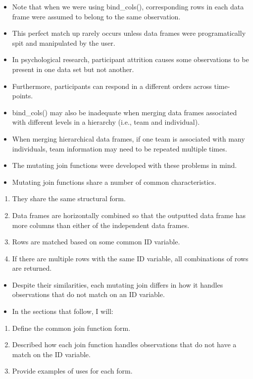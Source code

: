 \documentclass[]{book}
\providecommand{\tightlist}{%
  \setlength{\itemsep}{0pt}\setlength{\parskip}{0pt}}
\theoremstyle{definition}
\theoremstyle{definition}
\theoremstyle{definition}
\theoremstyle{remark}
\begin{document}
\begin{itemize}
\tightlist
\item
  Note that when we were using bind\_cols(), corresponding rows in each data frame were assumed to belong to the same observation.
\item
  This perfect match up rarely occurs unless data frames were programatically spit and manipulated by the user.
\item
  In psychological research, participant attrition causes some observations to be present in one data set but not another.
\item
  Furthermore, participants can respond in a different orders across time-points.
\item
  bind\_cols() may also be inadequate when merging data frames associated with different levels in a hierarchy (i.e., team and individual).
\item
  When merging hierarchical data frames, if one team is associated with many individuals, team information may need to be repeated multiple times.
\item
  The mutating join functions were developed with these problems in mind.
\item
  Mutating join functions share a number of common characteristics.
\end{itemize}

\begin{enumerate}
\def\labelenumi{\arabic{enumi}.}
\tightlist
\item
  They share the same structural form.
\item
  Data frames are horizontally combined so that the outputted data frame has more columns than either of the independent data frames.
\item
  Rows are matched based on some common ID variable.
\item
  If there are multiple rows with the same ID variable, all combinations of rows are returned.
\end{enumerate}

\begin{itemize}
\tightlist
\item
  Despite their similarities, each mutating join differs in how it handles observations that do not match on an ID variable.
\item
  In the sections that follow, I will:
\end{itemize}

\begin{enumerate}
\def\labelenumi{\arabic{enumi}.}
\tightlist
\item
  Define the common join function form.
\item
  Described how each join function handles observations that do not have a match on the ID variable.
\item
  Provide examples of uses for each form.
\end{enumerate}
\end{document}
